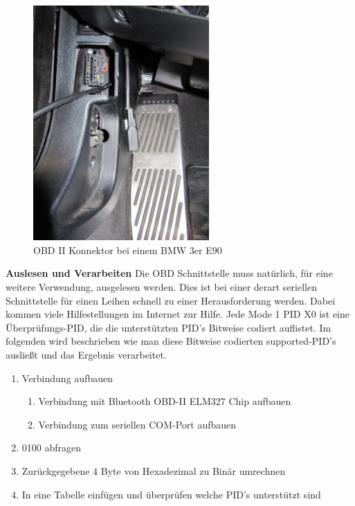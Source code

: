 \begin{figure}[!htb]\centering
	\includegraphics[width=0.6\textwidth]{images/3erobd}
	\caption{OBD II Konnektor bei einem BMW 3er E90 \cite{SIMR.CH2-CAN-Bus.3erOBD}}\label{Fig:Data3}
\end{figure}

\textbf{Auslesen und Verarbeiten\nextline}
Die OBD Schnittstelle muss natürlich, für eine weitere Verwendung,  ausgelesen werden. Dies ist bei einer derart seriellen Schnittstelle für einen Leihen schnell zu einer Herausforderung werden. Dabei kommen viele Hilfestellungen im Internet zur Hilfe. Jede Mode 1 PID X0 ist eine Überprüfungs-PID, die die unterstützten PID's Bitweise codiert auflistet. Im folgenden wird beschrieben wie man diese Bitweise codierten supported-PID's ausließt und das Ergebnis verarbeitet.

\begin{enumerate}
	\item Verbindung aufbauen
	\begin{enumerate}
		\item Verbindung mit Bluetooth OBD-II ELM327 Chip aufbauen
		\item Verbindung zum seriellen COM-Port aufbauen 
	\end{enumerate}
	\item 0100 abfragen
	\item Zurückgegebene 4 Byte von Hexadezimal zu Binär umrechnen
	\item In eine Tabelle einfügen und überprüfen welche PID's unterstützt sind
\end{enumerate}

